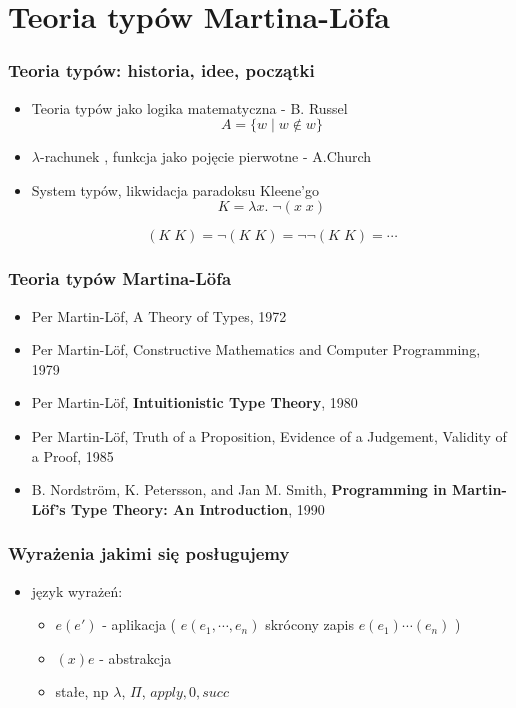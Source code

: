 \documentclass{beamer}
\begin{document}
\section{Teoria typów Martina-L\"{o}fa}

\begin{frame}
\frametitle{Teoria typów: historia, idee, początki}

\begin{itemize}
 \item Teoria typów jako logika matematyczna - B. Russel
 \[
  A = \{ w \mid w \not\in w \}
 \]
\pause
 \item $\lambda$-rachunek , funkcja jako pojęcie pierwotne  - A.Church
 \item System typów, likwidacja paradoksu Kleene'go
\[
 K = \lambda x.\; \neg (x\; x)
\]

\[
 (K\; K) = \neg (K\; K) = \neg \neg (K\; K) = \cdots
\]

\end{itemize}


\end{frame}


\begin{frame}
\frametitle{Teoria typów Martina-L\"{o}fa}

\begin{itemize}
\item Per Martin-L\"{o}f, A Theory of Types, 1972
\item Per Martin-L\"{o}f, Constructive Mathematics and Computer Programming, 1979
\item Per Martin-L\"{o}f, \textbf{Intuitionistic Type Theory}, 1980
\item Per Martin-L\"{o}f, Truth of a Proposition, Evidence of a Judgement, Validity of a Proof, 1985
\item B. Nordstr\"{o}m, K. Petersson, and Jan M. Smith, \textbf{ Programming in Martin-L\"{o}f's Type Theory: An Introduction}, 1990
\end{itemize}

\end{frame}

\begin{frame}
\frametitle{Wyrażenia jakimi się posługujemy}

\begin{itemize}
\item język wyrażeń:
\begin{itemize}
\item $e(e')$ - aplikacja ( $e(e_1, \cdots, e_n)$ skrócony zapis $e(e_1)\cdots(e_n)$ )
\item $(x)e$ - abstrakcja
\item stałe, np $\lambda$, $\Pi$, $apply, 0, succ$
\end{itemize}

\end{itemize}

\end{frame}
\end{document}
